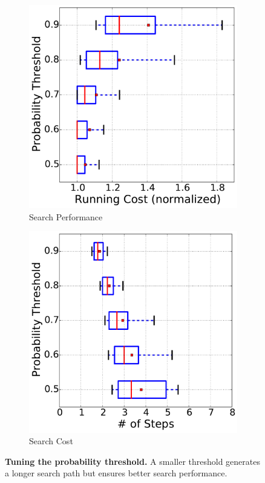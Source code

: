 \begin{figure}[!htbp]
\centering
\begin{subfigure}[b]{0.4\textwidth}
    \includegraphics[width=\linewidth]{figures/single_cost_tuning_probability_performance.pdf}
    \caption{Search Performance}
    \label{fig:single_cost_tuning_threshold_performance}
\end{subfigure}
\begin{subfigure}[b]{0.4\textwidth}
    \includegraphics[width=\linewidth]{figures/single_cost_tuning_probability_steps.pdf}
    \caption{Search Cost}
    \label{fig:single_cost_tuning_threshold_steps}
\end{subfigure}
\caption{\small{\textbf{Tuning the probability threshold.} A smaller threshold generates a longer search path but ensures better search performance.}}
\label{fig:single_probability_threshold}
\end{figure}

